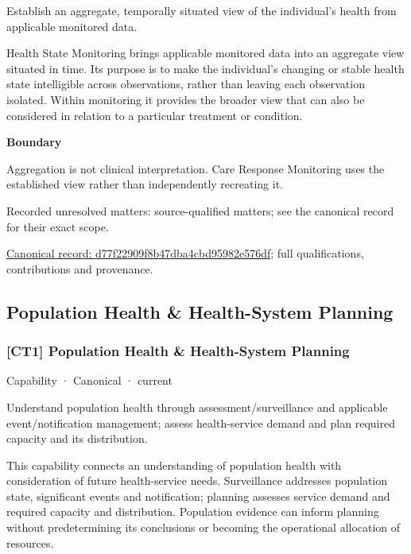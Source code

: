 Establish an aggregate, temporally situated view of the individual’s health from applicable monitored data.



Health State Monitoring brings applicable monitored data into an aggregate view situated in time. Its purpose is to make the individual's changing or stable health state intelligible across observations, rather than leaving each observation isolated. Within monitoring it provides the broader view that can also be considered in relation to a particular treatment or condition.



\textbf{Boundary}



Aggregation is not clinical interpretation. Care Response Monitoring uses the established view rather than independently recreating it.


{\small Recorded unresolved matters: source-qualified matters; see the canonical record for their exact scope.}\par
{\footnotesize \href{../../../../continuum/strategy/capability/d77f22909f8b47dba4cbd95982e576df.md}{Canonical record: d77f22909f8b47dba4cbd95982e576df}; full qualifications, contributions and provenance.}\par
\subsection{Population Health \& Health-System Planning}

\subsubsection{[CT1] Population Health \& Health-System Planning}

\label{element:c63b38b37e9b4e9b97dc87ed54604def}
{\small Capability · Canonical · current}\par

Understand population health through assessment/surveillance and applicable event/notification management; assess health-service demand and plan required capacity and its distribution.



This capability connects an understanding of population health with consideration of future health-service needs. Surveillance addresses population state, significant events and notification; planning assesses service demand and required capacity and distribution. Population evidence can inform planning without predetermining its conclusions or becoming the operational allocation of resources.



